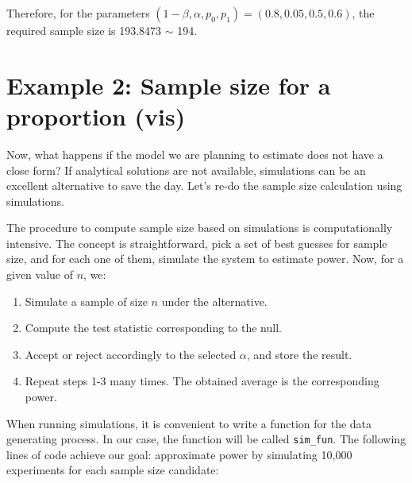\documentclass[]{book}
\begin{document}
Therefore, for the parameters \((1-\beta, \alpha, p_0, p_1) = (0.8, 0.05, 0.5, 0.6)\), the required sample size is 193.8473 \(\sim\) 194.

\hypertarget{example-2-sample-size-for-a-proportion-vis}{%
\section{Example 2: Sample size for a proportion (vis)}\label{example-2-sample-size-for-a-proportion-vis}}

Now, what happens if the model we are planning to estimate does not have a close form? If analytical solutions are not available, simulations can be an excellent alternative to save the day. Let's re-do the sample size calculation using simulations.

The procedure to compute sample size based on simulations is computationally intensive. The concept is straightforward, pick a set of best guesses for sample size, and for each one of them, simulate the system to estimate power. Now, for a given value of \(n\), we:

\begin{enumerate}
\def\labelenumi{\arabic{enumi}.}
\item
  Simulate a sample of size \(n\) under the alternative.
\item
  Compute the test statistic corresponding to the null.
\item
  Accept or reject accordingly to the selected \(\alpha\), and store the result.
\item
  Repeat steps 1-3 many times. The obtained average is the corresponding power.
\end{enumerate}

When running simulations, it is convenient to write a function for the data generating process. In our case, the function will be called \texttt{sim\_fun}. The following lines of code achieve our goal: approximate power by simulating 10,000 experiments for each sample size candidate:
\end{document}
